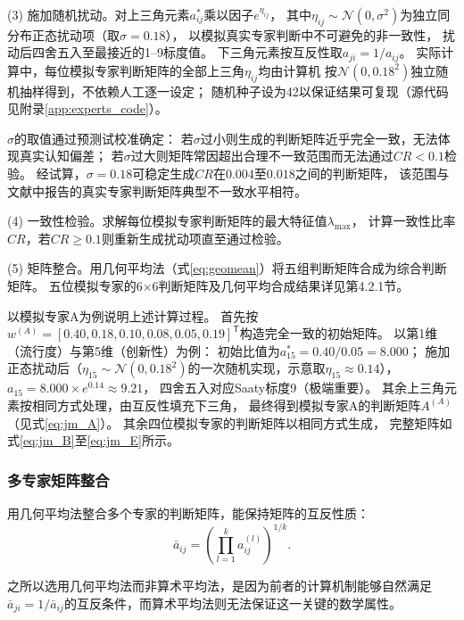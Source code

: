 \documentclass[twoside]{CUGThesis}
\begin{document}
(3) 施加随机扰动。对上三角元素$a_{ij}^*$乘以因子$e^{\eta_{ij}}$，
其中$\eta_{ij}\sim\mathcal{N}(0,\sigma^2)$为独立同分布正态扰动项（取$\sigma=0.18$），
以模拟真实专家判断中不可避免的非一致性\cite{Carmone1997}，
扰动后四舍五入至最接近的1--9标度值。
下三角元素按互反性取$a_{ji}=1/a_{ij}$。
实际计算中，每位模拟专家判断矩阵的全部上三角$\eta_{ij}$均由计算机
按$\mathcal{N}(0,0.18^2)$独立随机抽样得到，不依赖人工逐一设定；
随机种子设为42以保证结果可复现（源代码见附录\ref{app:experts_code}）。

$\sigma$的取值通过预测试校准确定：
若$\sigma$过小则生成的判断矩阵近乎完全一致，无法体现真实认知偏差；
若$\sigma$过大则矩阵常因超出合理不一致范围而无法通过$CR<0.1$检验。
经试算，$\sigma=0.18$可稳定生成$CR$在$0.004$至$0.018$之间的判断矩阵，
该范围与文献中报告的真实专家判断矩阵典型不一致水平相符\cite{Carmone1997}。

(4) 一致性检验。求解每位模拟专家判断矩阵的最大特征值$\lambda_{\max}$，
计算一致性比率$CR$，若$CR\geq 0.1$则重新生成扰动项直至通过检验。

(5) 矩阵整合。用几何平均法（式\eqref{eq:geomean}）将五组判断矩阵合成为综合判断矩阵。
五位模拟专家的6$\times$6判断矩阵及几何平均合成结果详见第4.2.1节。

以模拟专家A为例说明上述计算过程。
首先按$w^{(A)}=[0.40,0.18,0.10,0.08,0.05,0.19]^{\mathsf{T}}$构造完全一致的初始矩阵。
以第1维（流行度）与第5维（创新性）为例：
初始比值为$a_{15}^*=0.40/0.05=8.000$；
施加正态扰动后（$\eta_{15}\sim\mathcal{N}(0,0.18^2)$的一次随机实现，示意取$\eta_{15}\approx0.14$），
$a_{15}=8.000\times e^{0.14}\approx9.21$，
四舍五入对应Saaty标度9（极端重要）。
其余上三角元素按相同方式处理，由互反性填充下三角，
最终得到模拟专家A的判断矩阵$A^{(A)}$（见式\eqref{eq:jm_A}）。
其余四位模拟专家的判断矩阵以相同方式生成，
完整矩阵如式\eqref{eq:jm_B}至\eqref{eq:jm_E}所示。

\subsubsection{多专家矩阵整合}

用几何平均法整合多个专家的判断矩阵，能保持矩阵的互反性质：
\begin{equation}
\bar{a}_{ij} = \left( \prod_{l=1}^{k} a_{ij}^{(l)} \right)^{1/k} .
\label{eq:geomean}
\end{equation}

之所以选用几何平均法而非算术平均法，是因为前者的计算机制能够自然满足$\bar{a}_{ji} = 1/\bar{a}_{ij}$的互反条件，而算术平均法则无法保证这一关键的数学属性。
\end{document}
